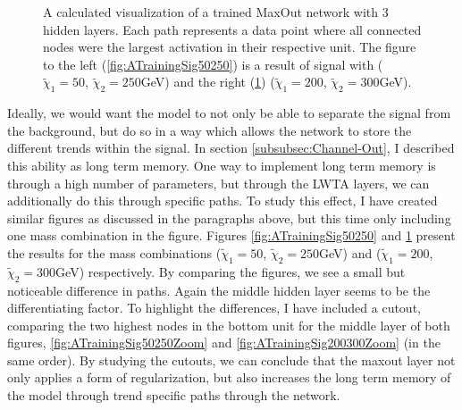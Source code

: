 \begin{figure}
{\begin{subfigure}{.6\textwidth}
        \caption{}
        \label{fig:ATrainingSig200300}
    \end{subfigure}
    }
    \caption[A calculated visualization of the activation of a 3 layer MaxOut network, after training and displaying the
    the results for two signal with each their own mass combination.]{A calculated visualization of a trained MaxOut network 
    with 3 hidden layers. Each path represents a data point where all connected nodes were the largest activation in their respective 
    unit. The figure to the left (\ref{fig:ATrainingSig50250}) is a result of signal with 
    ($\tilde{\chi}_1=50$, $\tilde{\chi}_2=250$GeV) and the right (\ref{fig:ATrainingSig200300}) 
    ($\tilde{\chi}_1=200$, $\tilde{\chi}_2=300$GeV).}
    \label{fig:NetVisSigComp}
\end{figure}
Ideally, we would want the model to not only be able to separate the signal from the background, but do so in 
a way which allows the network to store the different trends within the signal. In section \ref{subsubsec:Channel-Out},
I described this ability as long term memory. One way to implement long term memory is through a high number of parameters,
but through the \ac{LWTA} layers, we can additionally do this through specific paths. To study this effect, I have created similar 
figures as discussed in the paragraphs above, but this time only including one mass combination in the figure. Figures
\ref{fig:ATrainingSig50250} and \ref{fig:ATrainingSig200300} present the results for the mass combinations 
($\tilde{\chi}_1=50$, $\tilde{\chi}_2=250$GeV) and ($\tilde{\chi}_1=200$, $\tilde{\chi}_2=300$GeV) respectively.
By comparing the figures, we see a small but noticeable difference in paths. Again the middle hidden layer seems to be 
the differentiating factor. To highlight the differences, I have included a cutout, comparing the two highest nodes in the bottom unit 
for the middle layer of both figures, \ref{fig:ATrainingSig50250Zoom} and \ref{fig:ATrainingSig200300Zoom} (in the same order).
By studying the cutouts, we can conclude that the maxout layer not only applies a form of regularization, but also increases the long term 
memory of the model through trend specific paths through the network.
